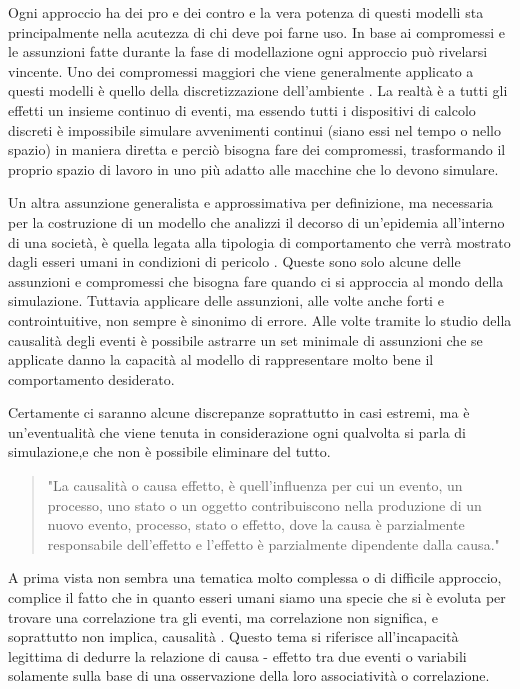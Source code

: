 Ogni approccio ha dei pro e dei contro e la vera potenza di 
questi modelli sta principalmente nella acutezza di chi deve 
poi farne uso. In base ai compromessi e le assunzioni fatte 
durante la fase di modellazione ogni approccio può rivelarsi 
vincente. Uno dei compromessi maggiori che viene generalmente 
applicato a questi modelli è quello della discretizzazione 
dell’ambiente \cite{KONSTANTINOUDIS2020100319}. 
La realtà è a tutti gli effetti un insieme continuo di eventi, 
ma essendo tutti i dispositivi di calcolo discreti è 
impossibile simulare avvenimenti continui 
(siano essi nel tempo o nello spazio) in maniera diretta e 
perciò bisogna fare dei compromessi, trasformando il proprio 
spazio di lavoro in uno più adatto alle macchine che lo devono 
simulare. 

Un altra assunzione generalista e approssimativa per 
definizione, ma necessaria per la costruzione di un modello 
che analizzi il decorso di un’epidemia all’interno di una 
società, è quella legata alla tipologia di comportamento che 
verrà mostrato dagli esseri umani in condizioni di pericolo 
\cite{Tracy2018-lc} \cite{El-Sayed2012-ac}. 
Queste sono solo alcune delle assunzioni e compromessi che 
bisogna fare quando ci si approccia al mondo della simulazione. 
Tuttavia applicare delle assunzioni, alle volte anche forti e 
controintuitive, non sempre è sinonimo di errore. 
Alle volte tramite lo studio della causalità degli eventi 
\cite{Galea2009-lj} \cite{Parascandola2001-kw} è possibile 
astrarre un set minimale di assunzioni che se applicate danno 
la capacità al modello di rappresentare molto bene il 
comportamento desiderato. 

Certamente ci saranno alcune discrepanze soprattutto in casi 
estremi, ma è un’eventualità che viene tenuta in considerazione 
ogni qualvolta si parla di simulazione,e che non è possibile 
eliminare del tutto. 

\begin{quotation}
    "La causalità o causa effetto, è quell’influenza per cui un evento, 
    un processo, uno stato o un oggetto contribuiscono nella produzione 
    di un nuovo evento, processo, stato o effetto, dove la causa è 
    parzialmente responsabile dell’effetto e l’effetto è parzialmente 
    dipendente dalla causa."
\end{quotation}

A prima vista non sembra una tematica molto complessa o di 
difficile approccio, complice il fatto che in quanto esseri 
umani siamo una specie che si è evoluta per trovare una 
correlazione tra gli eventi, ma correlazione non significa, 
e soprattutto non implica, causalità \cite{Altman2015}. 
Questo tema si riferisce all’incapacità legittima di dedurre 
la relazione di causa - effetto tra due eventi o variabili 
solamente sulla base di una osservazione della loro 
associatività o correlazione. 

